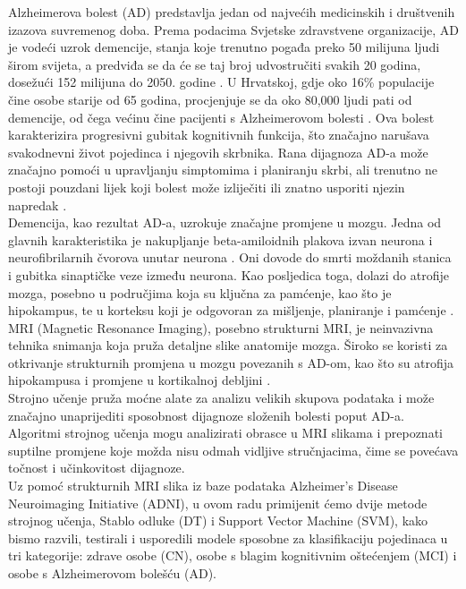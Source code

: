 \documentclass[zavrsnirad]{fer}
\begin{document}
Alzheimerova bolest (AD) predstavlja jedan od najvećih medicinskih i društvenih izazova suvremenog doba. Prema podacima Svjetske zdravstvene organizacije, AD je vodeći uzrok demencije, stanja koje trenutno pogađa preko 50 milijuna ljudi širom svijeta, a predviđa se da će se taj broj udvostručiti svakih 20 godina, dosežući 152 milijuna do 2050. godine \cite{PMID:29763097}. U Hrvatskoj, gdje oko 16\% populacije čine osobe starije od 65 godina, procjenjuje se da oko 80,000 ljudi pati od demencije, od čega većinu čine pacijenti s Alzheimerovom bolesti \cite{MIMICA2010409}. Ova bolest karakterizira progresivni gubitak kognitivnih funkcija, što značajno narušava svakodnevni život pojedinca i njegovih skrbnika. Rana dijagnoza AD-a može značajno pomoći u upravljanju simptomima i planiranju skrbi, ali trenutno ne postoji pouzdani lijek koji bolest može izliječiti ili znatno usporiti njezin napredak \cite{PMID:29763097}.
\\
Demencija, kao rezultat AD-a, uzrokuje značajne promjene u mozgu. Jedna od glavnih karakteristika je nakupljanje beta-amiloidnih plakova izvan neurona i neurofibrilarnih čvorova unutar neurona \cite{10.1007/s00500-020-05292-x}. Oni dovode do smrti moždanih stanica i gubitka sinaptičke veze između neurona. Kao posljedica toga, dolazi do atrofije mozga, posebno u područjima koja su ključna za pamćenje, kao što je hipokampus, te u korteksu koji je odgovoran za mišljenje, planiranje i pamćenje \cite{doi:10.1212/WNL.0b013e3181c3f293}.
\\
MRI (Magnetic Resonance Imaging), posebno strukturni MRI, je neinvazivna tehnika snimanja koja pruža detaljne slike anatomije mozga. Široko se koristi za otkrivanje strukturnih promjena u mozgu povezanih s AD-om, kao što su atrofija hipokampusa i promjene u kortikalnoj debljini \cite{10.3389/fnins.2015.00307}. 
\\
Strojno učenje pruža moćne alate za analizu velikih skupova podataka i može značajno unaprijediti sposobnost dijagnoze složenih bolesti poput AD-a. Algoritmi strojnog učenja mogu analizirati obrasce u MRI slikama i prepoznati suptilne promjene koje možda nisu odmah vidljive stručnjacima, čime se povećava točnost i učinkovitost dijagnoze.
\\
Uz pomoć strukturnih MRI slika iz baze podataka Alzheimer’s Disease Neuroimaging Initiative (ADNI), u ovom radu primijenit ćemo dvije metode strojnog učenja, Stablo odluke (DT) i Support Vector Machine (SVM), kako bismo razvili, testirali i usporedili modele sposobne za klasifikaciju pojedinaca u tri kategorije: zdrave osobe (CN), osobe s blagim kognitivnim oštećenjem (MCI) i osobe s Alzheimerovom bolešću (AD).
\end{document}
